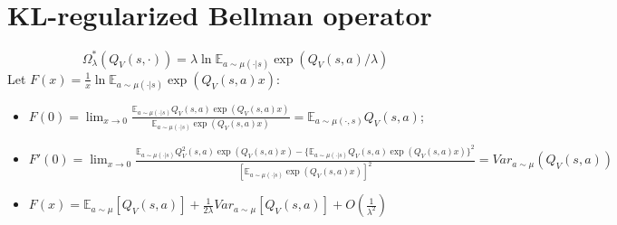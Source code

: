 \documentclass[a4paper]{article}
\begin{document}
\section{KL-regularized Bellman operator}%

\[
    \Omega^*_{\lambda}(Q_V(s, \cdot)) = \lambda \ln \mathbb{E}_{a \sim \mu(\cdot | s)} \exp(Q_V(s, a)/\lambda)
\]
Let $ F(x) = \frac{1}{x} \ln \mathbb{E}_{a \sim \mu(\cdot | s)}\exp \left( Q_V(s,a) x \right) $:
\begin{itemize}
    \item $ F(0) = \lim_{x \to 0} \frac{\mathbb{E}_{a \sim \mu(\cdot|s)} Q_V(s,a) \exp(Q_V(s,a) x)}{ \mathbb{E}_{a \sim \mu(\cdot | s)}\exp(Q_V(s,a) x)} = \mathbb{E}_{a \sim \mu(\cdot, s)} Q_V(s,a) $;
    \item $ F'(0) = \lim_{x \to 0} \frac{ \mathbb{E}_{a \sim \mu(\cdot | s)}Q^2_V(s,a)\exp(Q_V(s,a) x) - {\{\mathbb{E}_{a \sim \mu(\cdot|s)} Q_V(s,a) \exp(Q_V(s,a) x)\}}^2 }{{\left[  \mathbb{E}_{a \sim \mu(\cdot | s)}\exp(Q_V(s,a) x) \right]}^2} = {Var}_{a \sim \mu} (Q_V(s, a)) $
    \item $ F(x) = \mathbb{E}_{a\sim\mu}[Q_V(s,a)] + \frac{1}{2\lambda} {Var}_{a\sim \mu}[Q_V(s,a)] + O(\frac{1}{\lambda^2} ) $
\end{itemize}
\end{document}
